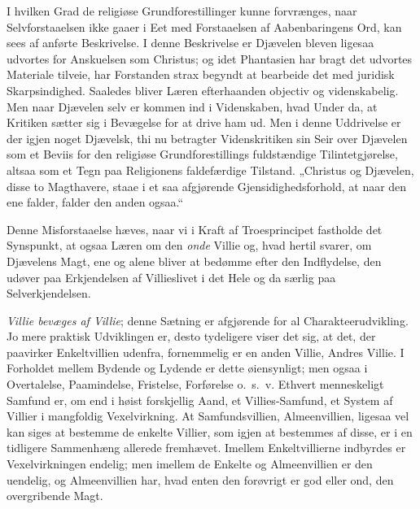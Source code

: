 \documentclass[12pt]{book}
\begin{document}
I hvilken Grad de religiøse Grundforestillinger kunne forvrænges,
naar Selvforstaaelsen ikke gaaer i Eet med Forstaaelsen af
Aabenbaringens Ord, kan sees af anførte Beskrivelse. I denne
Beskrivelse er Djævelen bleven ligesaa udvortes for Anskuelsen som
Christus; og idet Phantasien har bragt det udvortes Materiale
tilveie, har Forstanden strax begyndt at bearbeide det med juridisk
Skarpsindighed. Saaledes bliver Læren efterhaanden objectiv og
videnskabelig. Men naar Djævelen selv er kommen ind i Videnskaben,
hvad Under da, at Kritiken sætter sig i Bevægelse for at drive ham
ud. Men i denne Uddrivelse er der igjen noget Djævelsk, thi nu
betragter Videnskritiken sin Seir over Djævelen som et Beviis for
den religiøse Grundforestillings fuldstændige Tilintetgjørelse,
altsaa som et Tegn paa Religionens faldefærdige Tilstand. „Christus
og Djævelen, disse to Magthavere, staae i et saa afgjørende
Gjensidighedsforhold, at naar den ene falder, falder den anden
ogsaa.“

Denne Misforstaaelse hæves, naar vi i Kraft af Troesprincipet
fastholde det Synspunkt, at ogsaa Læren om den \emph{onde} Villie
og, hvad hertil svarer, om Djævelens Magt, ene og alene bliver at
bedømme efter den Indflydelse, den udøver paa Erkjendelsen af
Villieslivet i det Hele og da særlig paa Selverkjendelsen.

\emph{Villie bevæges af Villie}; denne Sætning er afgjørende for al
Charakteerudvikling. Jo mere praktisk Udviklingen er, desto
tydeligere viser det sig, at det, der paavirker Enkeltvillien
udenfra, fornemmelig er en anden Villie, Andres Villie. I Forholdet
mellem Bydende og Lydende er dette øiensynligt; men ogsaa i
Overtalelse, Paamindelse, Fristelse, Forførelse o.\ s.\ v. Ethvert
menneskeligt Samfund er, om end i høist forskjellig Aand, et
Villies-Samfund, et System af Villier i mangfoldig Vexelvirkning. At
Samfundsvillien, Almeenvillien, ligesaa vel kan siges at bestemme de
enkelte Villier, som igjen at bestemmes af disse, er i en tidligere
Sammenhæng allerede fremhævet. Imellem Enkeltvillierne indbyrdes er
Vexelvirkningen endelig; men imellem de Enkelte og Almeenvillien er
den uendelig, og Almeenvillien har, hvad enten den forøvrigt er god
eller ond, den overgribende Magt.
\end{document}

